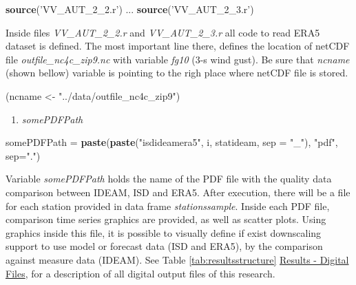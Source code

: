 \documentclass[12pt,oneside]{reedthesis}
\newenvironment{Shaded}{\begin{snugshade}}{\end{snugshade}}
\newcommand{\DataTypeTok}[1]{\textcolor[rgb]{0.13,0.29,0.53}{#1}}
\newcommand{\KeywordTok}[1]{\textcolor[rgb]{0.13,0.29,0.53}{\textbf{#1}}}
\newcommand{\NormalTok}[1]{#1}
\newcommand{\StringTok}[1]{\textcolor[rgb]{0.31,0.60,0.02}{#1}}
\providecommand{\tightlist}{%
  \setlength{\itemsep}{0pt}\setlength{\parskip}{0pt}}
\begin{document}
\vspace{0.4cm}
\begin{Shaded}
\begin{Highlighting}[]
      \KeywordTok{source}\NormalTok{(}\StringTok{'VV_AUT_2_2.r'}\NormalTok{)}
\NormalTok{      ...}
      \KeywordTok{source}\NormalTok{(}\StringTok{'VV_AUT_2_3.r'}\NormalTok{)}
\end{Highlighting}
\end{Shaded}
\normalsize

Inside files \emph{VV\_AUT\_2\_2.r} and \emph{VV\_AUT\_2\_3.r} all code to read ERA5 dataset is defined. The most important line there, defines the location of netCDF file \emph{outfile\_nc4c\_zip9.nc} with variable \emph{fg10} (3-s wind gust). Be sure that \emph{ncname} (shown bellow) variable is pointing to the righ place where netCDF file is stored.

\scriptsize

\vspace{0.4cm}
\begin{Shaded}
\begin{Highlighting}[]
\NormalTok{      (ncname <-}\StringTok{ "../data/outfile_nc4c_zip9"}\NormalTok{)}
\end{Highlighting}
\end{Shaded}
\normalsize
\begin{enumerate}
\def\labelenumi{\arabic{enumi}.}
\setcounter{enumi}{4}
\tightlist
\item
  \emph{somePDFPath}
\end{enumerate}
\scriptsize

\vspace{0.4cm}
\begin{Shaded}
\begin{Highlighting}[]
\NormalTok{      somePDFPath =}\StringTok{ }\KeywordTok{paste}\NormalTok{(}\KeywordTok{paste}\NormalTok{(}\StringTok{"isdideamera5"}\NormalTok{, i, statideam, }\DataTypeTok{sep =} \StringTok{"_"}\NormalTok{), }\StringTok{"pdf"}\NormalTok{, }\DataTypeTok{sep=}\StringTok{"."}\NormalTok{)}
\end{Highlighting}
\end{Shaded}
\normalsize

Variable \emph{somePDFPath} holds the name of the PDF file with the quality data comparison between IDEAM, ISD and ERA5. After execution, there will be a file for each station provided in data frame \emph{stationssample}. Inside each PDF file, comparison time series graphics are provided, as well as scatter plots. Using graphics inside this file, it is possible to visually define if exist downscaling support to use model or forecast data (ISD and ERA5), by the comparison against measure data (IDEAM). See Table \ref{tab:resultsstructure} \protect\hyperlink{results}{Results - Digital Files}, for a description of all digital output files of this research.
\end{document}
